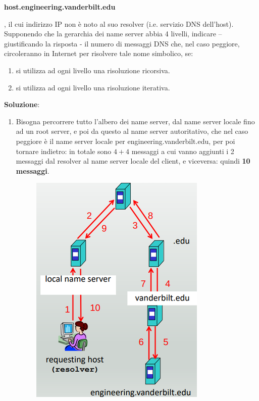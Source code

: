 \documentclass[11pt,a4paper]{article}
\theoremstyle{definition}
\begin{document}
\begin{enumerate}
\begin{center}
		      \textbf{host.engineering.vanderbilt.edu}
	      \end{center}, il cui indirizzo IP non è noto al suo resolver (i.e. servizio DNS dell’host). Supponendo che la gerarchia dei name server abbia 4 livelli, indicare – giustificando la risposta - il numero di messaggi DNS che, nel caso peggiore, circoleranno in Internet per risolvere tale nome simbolico, se:
	      \begin{enumerate}
		      \item si utilizza ad ogni livello una risoluzione ricorsiva.
		      \item si utilizza ad ogni livello una risoluzione iterativa.
	      \end{enumerate}
	      \textbf{Soluzione}:
	      \begin{enumerate}
		      \item  Bisogna	percorrere tutto l'albero dei name server, dal name server locale fino ad un root server, e poi da questo al name server autoritativo, che nel caso peggiore è il name server locale per engineering.vanderbilt.edu, per poi tornare indietro: in totale sono $4 + 4$ messaggi a cui vanno aggiunti i 2 messaggi dal resolver al name server locale del client, e viceversa: quindi \textbf{10 messaggi}.
		            \begin{figure}[!h]
			            \includegraphics[scale=0.25]{Immagini/Es1_1.png}
			            \centering
		            \end{figure}\newline

\end{enumerate}
\end{enumerate}
\end{document}
